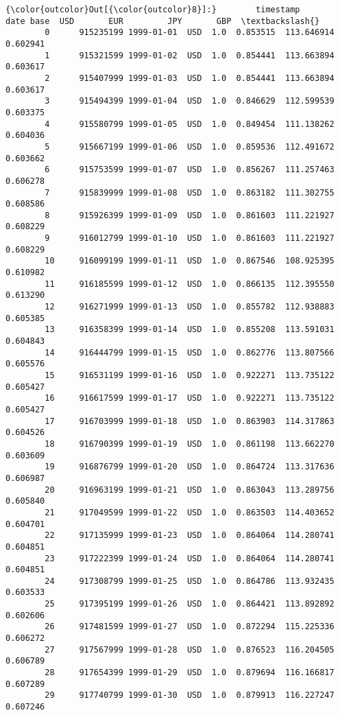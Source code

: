 \documentclass[11pt]{article}
\begin{document}
\begin{Verbatim}[commandchars=\\\{\}]
{\color{outcolor}Out[{\color{outcolor}8}]:}        timestamp       date base  USD       EUR         JPY       GBP  \textbackslash{}
        0      915235199 1999-01-01  USD  1.0  0.853515  113.646914  0.602941   
        1      915321599 1999-01-02  USD  1.0  0.854441  113.663894  0.603617   
        2      915407999 1999-01-03  USD  1.0  0.854441  113.663894  0.603617   
        3      915494399 1999-01-04  USD  1.0  0.846629  112.599539  0.603375   
        4      915580799 1999-01-05  USD  1.0  0.849454  111.138262  0.604036   
        5      915667199 1999-01-06  USD  1.0  0.859536  112.491672  0.603662   
        6      915753599 1999-01-07  USD  1.0  0.856267  111.257463  0.606278   
        7      915839999 1999-01-08  USD  1.0  0.863182  111.302755  0.608586   
        8      915926399 1999-01-09  USD  1.0  0.861603  111.221927  0.608229   
        9      916012799 1999-01-10  USD  1.0  0.861603  111.221927  0.608229   
        10     916099199 1999-01-11  USD  1.0  0.867546  108.925395  0.610982   
        11     916185599 1999-01-12  USD  1.0  0.866135  112.395550  0.613290   
        12     916271999 1999-01-13  USD  1.0  0.855782  112.938883  0.605385   
        13     916358399 1999-01-14  USD  1.0  0.855208  113.591031  0.604843   
        14     916444799 1999-01-15  USD  1.0  0.862776  113.807566  0.605576   
        15     916531199 1999-01-16  USD  1.0  0.922271  113.735122  0.605427   
        16     916617599 1999-01-17  USD  1.0  0.922271  113.735122  0.605427   
        17     916703999 1999-01-18  USD  1.0  0.863903  114.317863  0.604526   
        18     916790399 1999-01-19  USD  1.0  0.861198  113.662270  0.603609   
        19     916876799 1999-01-20  USD  1.0  0.864724  113.317636  0.606987   
        20     916963199 1999-01-21  USD  1.0  0.863043  113.289756  0.605840   
        21     917049599 1999-01-22  USD  1.0  0.863503  114.403652  0.604701   
        22     917135999 1999-01-23  USD  1.0  0.864064  114.280741  0.604851   
        23     917222399 1999-01-24  USD  1.0  0.864064  114.280741  0.604851   
        24     917308799 1999-01-25  USD  1.0  0.864786  113.932435  0.603533   
        25     917395199 1999-01-26  USD  1.0  0.864421  113.892892  0.602606   
        26     917481599 1999-01-27  USD  1.0  0.872294  115.225336  0.606272   
        27     917567999 1999-01-28  USD  1.0  0.876523  116.204505  0.606789   
        28     917654399 1999-01-29  USD  1.0  0.879694  116.166817  0.607289   
        29     917740799 1999-01-30  USD  1.0  0.879913  116.227247  0.607246   

\end{Verbatim}
\end{document}
